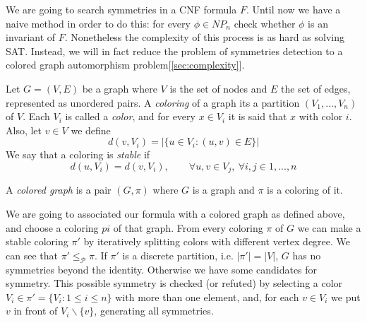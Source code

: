 We are going to search symmetries in a CNF formula $F$. Until now we have a naive method in order to do this: for every $\phi \in NP_n$ check whether $\phi$ is an invariant of $F$. Nonetheless the complexity of this process is as hard as solving SAT. Instead, we will in fact reduce the problem of symmetries detection to a colored graph  automorphism problem[\ref{sec:complexity}].\\








\begin{definition}
  Let $G = (V,E)$ be a graph where $V$ is the set of nodes and $E$ the set of edges, represented as unordered pairs. A \emph{coloring} of a graph its a partition  $(V_1,...,V_n)$ of $V$. Each  $V_i$ is called a \emph{color}, and for every $x\in V_i$ it is said that $x$ with color $i$. Also, let $v\in V$ we define $$d(v, V_i) = |\{u \in V_i : (u,v)\in E\}|$$
  We say that a coloring is \emph{stable} if
  $$d(u,V_i) = d(v,V_i), \qquad  \forall u,v \in V_j,\ \forall i,j \in 1,...,n$$

  A \emph{colored graph} is a pair $(G,\pi)$ where $G$ is a graph and $\pi$ is a coloring of it.
\end{definition}


We are going to associated our formula with a colored graph as defined above, and choose a coloring $pi$ of that graph. From every coloring $\pi$ of $G$ we can make a stable coloring $\pi'$ by iteratively splitting colors with different vertex degree. We can see that $\pi' \le_\mathcal{P} \pi$. If $\pi'$ is a discrete partition, i.e. $|\pi'| = |V|$,  $G$ has no symmetries beyond the identity. Otherwise we have some candidates for symmetry. This possible symmetry is checked (or refuted) by selecting a color $V_i\in \pi' = \{V_i : 1 \le i \le n\}$ with more than one element, and, for each $v\in V_i$ we put $v$ in front of $V_i \backslash \{v\}$, generating all symmetries.

